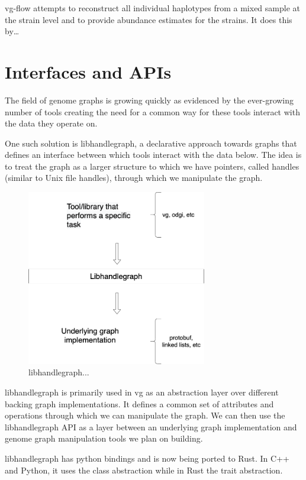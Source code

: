 \documentclass[11pt]{article}
\begin{document}
vg-flow \cite{baaijensStrainawareAssemblyGenomes2020} attempts to reconstruct all 
individual haplotypes from a mixed sample at the strain level and to provide
abundance estimates for the strains. It does this by\ldots{}

\section{Interfaces and APIs}
\label{sec:orga3ad94c}
The field of genome graphs is growing quickly as evidenced by the ever-growing
number of tools creating the need for a common way for these tools interact with
the data they operate on.

One such solution is libhandlegraph, a declarative approach towards graphs that
defines an interface between which tools interact with the data below. 
The idea is to treat the graph as a larger structure to which we have pointers,
called handles (similar to  Unix file handles), through which we manipulate the
graph. 

\begin{figure}[h]
\centering
\includegraphics[width=0.7\textwidth]{figures/libhandlegraph.png}
\caption{libhandlegraph...}
\end{figure}

libhandlegraph is primarily used in vg as an abstraction layer over different
backing graph implementations.
It defines a common set of attributes and operations through which we can
manipulate the graph. We can then use the libhandlegraph API as a layer between
an underlying graph implementation and genome graph manipulation tools we plan 
on building.

libhandlegraph has python bindings and is now being ported to Rust. In C++ and 
Python, it uses the class abstraction while in Rust the trait abstraction.
\end{document}
